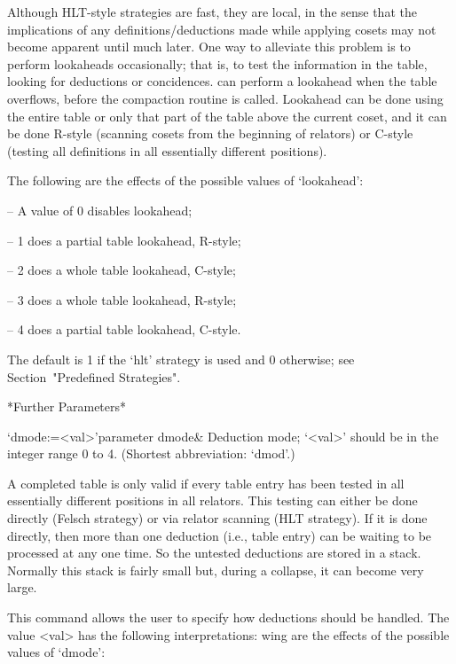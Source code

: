 Although HLT-style strategies  are fast, they are local,  in the sense
that  the  implications   of  any  definitions/deductions  made  while
applying cosets may not become  apparent until much later.  One way to
alleviate this problem is to perform lookaheads occasionally; that is,
to  test the  information  in  the table,  looking  for deductions  or
concidences.  {\ACE} can perform a lookahead when the table overflows,
before the compaction routine is  called.  Lookahead can be done using
the entire  table or  only that  part of the  table above  the current
coset, and it can be  done R-style (scanning cosets from the beginning
of relators)  or C-style (testing  all definitions in  all essentially
different positions).

The following are the effects of the possible values of `lookahead':

\beginlist

\item{--} A value of 0 disables lookahead;
\item{--} 1 does a partial table lookahead, R-style; 
\item{--} 2 does a whole table lookahead, C-style; 
\item{--} 3 does a whole table lookahead, R-style; 
\item{--} 4 does a partial table lookahead, C-style.  

\endlist

The  default  is  1 if the `hlt' strategy is used and 0 otherwise;
see Section~"Predefined Strategies".

*Further Parameters*

\>`dmode:=<val>'{parameter dmode}&
Deduction mode; `<val>' should be in the integer range 0 to 4.
(Shortest abbreviation: `dmod'.)

A completed table  is only valid if every table  entry has been tested
in all essentially different  positions in all relators.  This testing
can either be done directly  (Felsch strategy) or via relator scanning
(HLT strategy).  If it is  done directly, then more than one deduction
(i.e., table  entry) can be waiting  to be processed at  any one time.
So the untested deductions are stored in a stack.  Normally this stack
is fairly small but, during a collapse, it can become very large.

This  command allows  the user  to  specify how  deductions should  be
handled.  The value <val> has the following interpretations:
wing are the effects of the possible values of `dmode':


